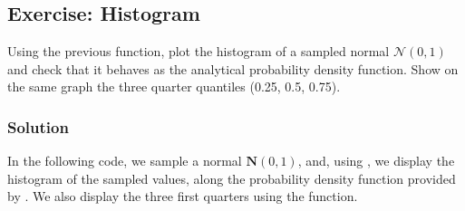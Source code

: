 \documentclass[letterpaper,10pt,english]{jupyterBook}
\begin{document}
\subsection{Exercise: Histogram}
\label{\detokenize{01:exercise-histogram}}
\sphinxAtStartPar
Using the previous  function, plot the histogram of a sampled normal \(\mathcal{N}(0, 1)\) and check that it behaves as the analytical probability density function. Show on the same graph the three quarter quantiles (0.25, 0.5, 0.75).


\subsubsection{Solution}
\label{\detokenize{01:solution}}
\sphinxAtStartPar
In the following code, we sample a normal \(\mathbf{N}(0, 1)\), and, using , we display the histogram of the sampled values, along the probability density function provided by . We also display the three first quarters using the  function.
\end{document}
